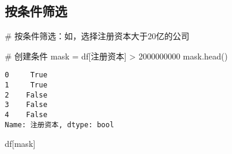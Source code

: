 \documentclass[
  letterpaper,
  DIV=11,
  numbers=noendperiod]{scrreprt}
\newenvironment{Shaded}{\begin{snugshade}}{\end{snugshade}}
\newcommand{\CommentTok}[1]{\textcolor[rgb]{0.37,0.37,0.37}{#1}}
\newcommand{\DecValTok}[1]{\textcolor[rgb]{0.68,0.00,0.00}{#1}}
\newcommand{\NormalTok}[1]{\textcolor[rgb]{0.00,0.23,0.31}{#1}}
\newcommand{\OperatorTok}[1]{\textcolor[rgb]{0.37,0.37,0.37}{#1}}
\newcommand{\StringTok}[1]{\textcolor[rgb]{0.13,0.47,0.30}{#1}}
\begin{document}
\hypertarget{ux6309ux6761ux4ef6ux7b5bux9009}{%
\subsection{按条件筛选}\label{ux6309ux6761ux4ef6ux7b5bux9009}}

\begin{Shaded}
\begin{Highlighting}[]
\CommentTok{\# 按条件筛选：如，选择注册资本大于20亿的公司}

\CommentTok{\# 创建条件}
\NormalTok{mask }\OperatorTok{=}\NormalTok{ df[}\StringTok{\textquotesingle{}注册资本\textquotesingle{}}\NormalTok{] }\OperatorTok{\textgreater{}} \DecValTok{2000000000}
\NormalTok{mask.head()}
\end{Highlighting}
\end{Shaded}

\begin{verbatim}
0     True
1     True
2    False
3    False
4    False
Name: 注册资本, dtype: bool
\end{verbatim}

\begin{Shaded}
\begin{Highlighting}[]
\NormalTok{df[mask]}
\end{Highlighting}
\end{Shaded}
\end{document}
